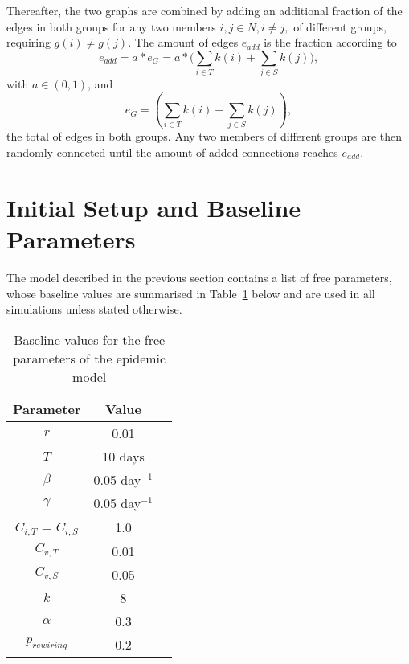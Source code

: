 \documentclass[11pt]{article}
\begin{document}
Thereafter, the two graphs are combined by adding an additional fraction of the edges in both groups for any two members \(i,j\in{N},i\neq j,\) of different groups, requiring \(g(i)\neq g(j)\). The amount of edges \(e_{add}\) is the fraction according to 
\begin{equation}\label{eq:21}
e_{add}=a*e_{G}=a*\bigg(\sum_{i\in{T}}k(i) + \sum_{j\in{S}}k(j)\bigg),
\end{equation}
with \(a\in{(0,1)}\), and 
\begin{equation}\label{eq:22}
	e_{G}=(\sum_{i\in{T}}k(i) + \sum_{j\in{S}}k(j)),
\end{equation} 
the total of edges in both groups. Any two members of different groups are then randomly connected until the amount of added connections reaches \(e_{add}\).  

\section{Initial Setup and Baseline Parameters}

The model described in the previous section contains a list of free parameters, whose baseline values are summarised in Table~\ref{tab:Table1} below and are used in all simulations unless stated otherwise.

\begin{table}[htbp]
        \centering
        \begin{tabular}{|c|c|c|}
        \hline
                Parameter    &    Value       \\
         \hline
                 \(r\)       &    0.01        \\
	\hline
                 \(T\)       &    10 days        \\
        \hline
                 \(\beta\)   &    0.05 day\(^{-1}\)        \\
        \hline
                 \(\gamma\)   &    0.05  day\(^{-1}\)      \\
        \hline
                 \(C_{i,T}\) = \(C_{i,S}\) &    1.0    \\
        \hline
                 \(C_{v,T}\)  &    0.01       \\
        \hline
		 \(C_{v,S}\)  &    0.05       \\
        \hline
		 \(k\)  &    8      	      \\
        \hline
		 \(\alpha\)  &    0.3         \\
        \hline
		 \(p_{rewiring}\)  &    0.2   \\
        \hline
        \end{tabular}
        \caption{Baseline values for the free parameters of the epidemic model}
        \label{tab:Table1}
    \end{table}
\end{document}
